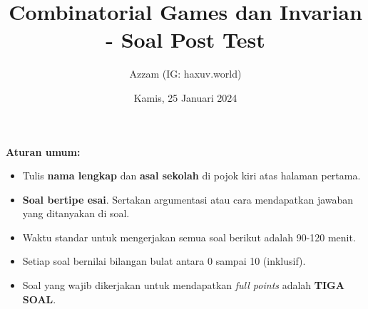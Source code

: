 \documentclass[12pt]{scrartcl}
\title{Combinatorial Games dan Invarian - Soal Post Test}
\author{Azzam (IG: haxuv.world)}
\date{Kamis, 25 Januari 2024}
\begin{document}
\maketitle

\renewcommand*\contentsname{Daftar Isi}
\tableofcontents

\newpage
\textbf{Aturan umum:}
\begin{itemize}
    \item Tulis \textbf{nama lengkap} dan \textbf{asal sekolah} di pojok kiri atas halaman pertama.
    \item \textbf{Soal bertipe esai}. Sertakan argumentasi atau cara mendapatkan jawaban yang ditanyakan di soal.
    \item Waktu standar untuk mengerjakan semua soal berikut adalah 90-120 menit.
    \item Setiap soal bernilai bilangan bulat antara 0 sampai 10 (inklusif).
    \item Soal yang wajib dikerjakan untuk mendapatkan \textit{full points} adalah \textbf{TIGA SOAL}.
\end{itemize}
\end{document}
